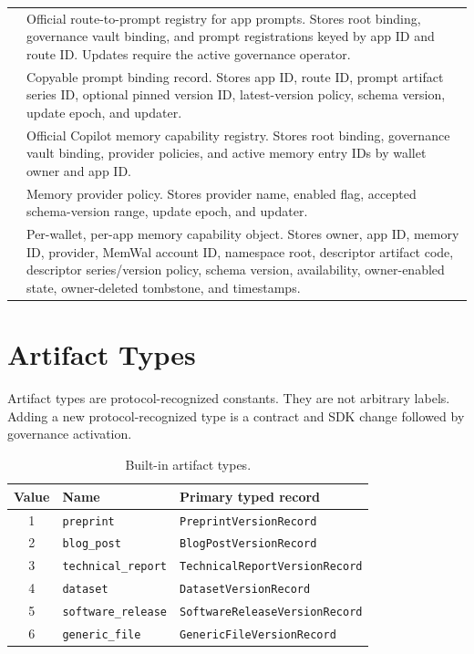 \documentclass[11pt]{article}
\newcommand{\code}[1]{\texttt{#1}}
\newcommand{\breakcode}[1]{\begingroup\ttfamily\small\seqsplit{#1}\endgroup}
\begin{document}
\begin{longtable}{>{\raggedright\arraybackslash}p{}>{\raggedright\arraybackslash}p{}}
\breakcode{PromptRegistry} & Official route-to-prompt registry for app prompts. Stores root binding, governance vault binding, and prompt registrations keyed by app ID and route ID. Updates require the active governance operator. \\
\breakcode{PromptRegistration} & Copyable prompt binding record. Stores app ID, route ID, prompt artifact series ID, optional pinned version ID, latest-version policy, schema version, update epoch, and updater. \\
\breakcode{MemoryRegistry} & Official Copilot memory capability registry. Stores root binding, governance vault binding, provider policies, and active memory entry IDs by wallet owner and app ID. \\
\breakcode{ProviderPolicy} & Memory provider policy. Stores provider name, enabled flag, accepted schema-version range, update epoch, and updater. \\
\breakcode{MemoryEntry} & Per-wallet, per-app memory capability object. Stores owner, app ID, memory ID, provider, MemWal account ID, namespace root, descriptor artifact code, descriptor series/version policy, schema version, availability, owner-enabled state, owner-deleted tombstone, and timestamps. \\
\bottomrule
\end{longtable}

\section{Artifact Types}

Artifact types are protocol-recognized constants. They are not arbitrary labels. Adding a new protocol-recognized type is a contract and SDK change followed by governance activation.

\begin{table}[htbp]
\centering
\caption{Built-in artifact types.}
\label{tab:artifact-types}
\begin{tabular}{cll}
\toprule
\textbf{Value} & \textbf{Name} & \textbf{Primary typed record} \\
\midrule
1 & \code{preprint} & \code{PreprintVersionRecord} \\
2 & \code{blog\_post} & \code{BlogPostVersionRecord} \\
3 & \code{technical\_report} & \code{TechnicalReportVersionRecord} \\
4 & \code{dataset} & \code{DatasetVersionRecord} \\
5 & \code{software\_release} & \code{SoftwareReleaseVersionRecord} \\
6 & \code{generic\_file} & \code{GenericFileVersionRecord} \\
\bottomrule
\end{tabular}
\end{table}
\end{document}
